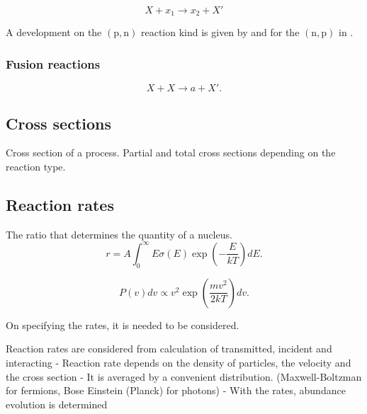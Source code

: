 \documentclass[openany]{book}
\begin{document}
\begin{equation}  \label{eq:nuclearReaction_exchange}
	X +  x_1 \rightarrow x_2 + X'
\end{equation}

A development on the $\mathrm{(p,n)}$ reaction kind is given by \cite{whitehead_poxon-pearson_nunes_potel_2022} and for the $\mathrm{(n,p)}$ in \cite{sharma_gandhi_kumar_2022}. \\



\subsubsection{Fusion reactions} \label{ssub:fusionReactions}

\begin{equation}  \label{eq:nuclearReaction_fusion}
	X + X \rightarrow a + X'.
\end{equation}

\subsection{Cross sections} \label{sub:crossSections}

Cross section of a process. 
Partial and total cross sections depending on the reaction type.

\subsection{Reaction rates} \label{sub:reactionRates}

The ratio that determines the quantity of a nucleus.
\begin{equation}  \label{eq:reactionRate_definition}
	r = A \int_0^{\infty} { E \sigma(E) \exp\left({-\frac{E}{kT}}\right)  dE}.
\end{equation}

\begin{equation} \label{eq:maxwellBoltzmann}
	P(v)dv \propto v^2 \exp{\left({\frac{mv^2}{2kT}}\right)}dv.
\end{equation}

On specifying the rates, it is needed to be considered.

Reaction rates are considered from calculation of transmitted, incident and interacting 
- Reaction rate depends on the density of particles, the velocity and the cross section
-	It is averaged by a convenient distribution. (Maxwell-Boltzman for fermions, Bose Einstein (Planck) for photons)
-	With the rates, abundance evolution is determined 
\end{document}
